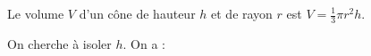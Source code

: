 
Le volume $V$ d'un cône de hauteur $h$ et de rayon $r$ est $V=\frac{1}{3} \pi r^{2} h$.

On cherche à isoler $h$. On a :

\smallskip

